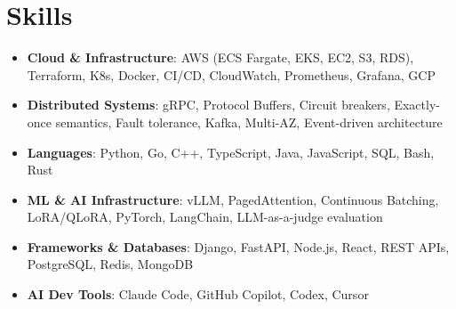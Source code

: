 \documentclass[letterpaper,11pt]{article}
\newcommand{\resumeSubHeadingListStart}{\begin{itemize}[leftmargin=0.15in, label={}]}
\newcommand{\resumeSubHeadingListEnd}{\end{itemize}}
\newcommand{\resumeSkillHeading}[2]{%
  \item\small{\textbf{#1}: #2 \vspace{-9pt}}%
}
\begin{document}
\section{Skills}
  \resumeSubHeadingListStart
    \resumeSkillHeading{Cloud \& Infrastructure}{AWS (ECS Fargate, EKS, EC2, S3, RDS), Terraform, K8s, Docker, CI/CD, CloudWatch, Prometheus, Grafana, GCP}
    \resumeSkillHeading{Distributed Systems}{gRPC, Protocol Buffers, Circuit breakers, Exactly-once semantics, Fault tolerance, Kafka, Multi-AZ, Event-driven architecture}
    \resumeSkillHeading{Languages}{Python, Go, C++, TypeScript, Java, JavaScript, SQL, Bash, Rust}
    \resumeSkillHeading{ML \& AI Infrastructure}{vLLM, PagedAttention, Continuous Batching, LoRA/QLoRA, PyTorch, LangChain, LLM-as-a-judge evaluation}
    \resumeSkillHeading{Frameworks \& Databases}{Django, FastAPI, Node.js, React, REST APIs, PostgreSQL, Redis, MongoDB}
    \resumeSkillHeading{AI Dev Tools}{Claude Code, GitHub Copilot, Codex, Cursor}
  \resumeSubHeadingListEnd
\end{document}
